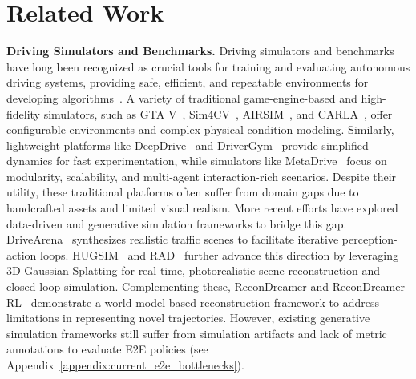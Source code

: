 \documentclass{article}
\begin{document}
\section{Related Work}
\textbf{Driving Simulators and Benchmarks.} Driving simulators and benchmarks have long been recognized as crucial tools for training and evaluating autonomous driving systems, providing safe, efficient, and repeatable environments for developing algorithms~\cite{alghodhaifi2021autonomous, rosique2019systematic, ye2019automated, osinski2020simulation, wu2024recent}. A variety of traditional game-engine-based and high-fidelity simulators, such as GTA V~\cite{gtav}, Sim4CV~\cite{muller2018sim4cv}, AIRSIM~\cite{shah2018airsim}, and CARLA~\cite{dosovitskiy2017carla}, offer configurable environments and complex physical condition modeling. Similarly, lightweight platforms like DeepDrive~\cite{deepdrive} and DriverGym~\cite{kothari2021drivergym} provide simplified dynamics for fast experimentation, while simulators like MetaDrive~\cite{li2022metadrive} focus on modularity, scalability, and multi-agent interaction-rich scenarios. Despite their utility, these traditional platforms often suffer from domain gaps due to handcrafted assets and limited visual realism. More recent efforts have explored data-driven and generative simulation frameworks to bridge this gap. DriveArena~\cite{yang2024drivearena} synthesizes realistic traffic scenes to facilitate iterative perception-action loops. HUGSIM~\cite{zhou2024hugsim} and RAD~\cite{gao2025rad} further advance this direction by leveraging 3D Gaussian Splatting for real-time, photorealistic scene reconstruction and closed-loop simulation. Complementing these, ReconDreamer and ReconDreamer-RL~\cite{ni2025recondreamer, ni2025recondreamerrl} demonstrate a world-model-based reconstruction framework to address limitations in representing novel trajectories. However, existing generative simulation frameworks still suffer from simulation artifacts and lack of metric annotations to evaluate E2E policies (see Appendix~\ref{appendix:current_e2e_bottlenecks}).
\end{document}
